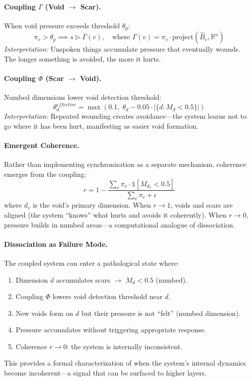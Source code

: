 \documentclass[11pt]{article}
\begin{document}
\paragraph{Coupling $\Gamma$ (Void $\to$ Scar).}
When void pressure exceeds threshold $\theta_p$:
\begin{equation}
\pi_v > \theta_p \implies s \triangleright \Gamma(v), \quad \text{where } \Gamma(v) = \pi_v \cdot \text{project}(\hat{B}_v, \mathbb{R}^n)
\end{equation}
\emph{Interpretation:} Unspoken things accumulate pressure that eventually wounds. The longer something is avoided, the more it hurts.

\paragraph{Coupling $\Phi$ (Scar $\to$ Void).}
Numbed dimensions lower void detection threshold:
\begin{equation}
\theta_d^{effective} = \max\left(0.1,\; \theta_d - 0.05 \cdot |\{d : M_d < 0.5\}|\right)
\end{equation}
\emph{Interpretation:} Repeated wounding creates avoidance---the system learns not to go where it has been hurt, manifesting as easier void formation.

\paragraph{Emergent Coherence.}
Rather than implementing synchronization as a separate mechanism, coherence emerges from the coupling:
\begin{equation}
r = 1 - \frac{\sum_v \pi_v \cdot \mathbb{1}[M_{d_v} < 0.5]}{\sum_v \pi_v + \epsilon}
\label{eq:coherence}
\end{equation}
where $d_v$ is the void's primary dimension. When $r \to 1$, voids and scars are aligned (the system ``knows'' what hurts and avoids it coherently). When $r \to 0$, pressure builds in numbed areas---a computational analogue of dissociation.

\paragraph{Dissociation as Failure Mode.}
The coupled system can enter a pathological state where:
\begin{enumerate}
\item Dimension $d$ accumulates scars $\to$ $M_d < 0.5$ (numbed).
\item Coupling $\Phi$ lowers void detection threshold near $d$.
\item New voids form on $d$ but their pressure is not ``felt'' (numbed dimension).
\item Pressure accumulates without triggering appropriate response.
\item Coherence $r \to 0$: the system is internally inconsistent.
\end{enumerate}
This provides a formal characterization of when the system's internal dynamics become incoherent---a signal that can be surfaced to higher layers.
\end{document}
